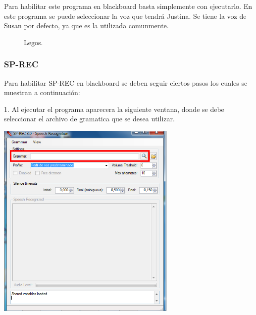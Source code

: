 \documentclass[user_manual.tex]{subfiles}
\begin{document}
Para habilitar este programa en blackboard basta simplemente con ejecutarlo. En este programa se puede seleccionar la voz que tendrá Justina. Se tiene la voz de Susan por defecto, ya que es la utilizada comunmente.

\begin{figure}[H]
\centering
{}
\caption{Legos.} \label{fig:SP-GEN}
\end{figure}

\subsubsection{SP-REC}

Para habilitar SP-REC en blackboard se deben seguir ciertos pasos los cuales se muestran a continuación:

1. Al ejecutar el programa aparecera la siguiente ventana, donde se debe seleccionar el archivo de gramatica que se desea utilizar.

\begin{center}
\includegraphics[width=0.65\textwidth]{Figures/Puesta_marcha/SPREC_gram.png}
\end{center}
\end{document}
